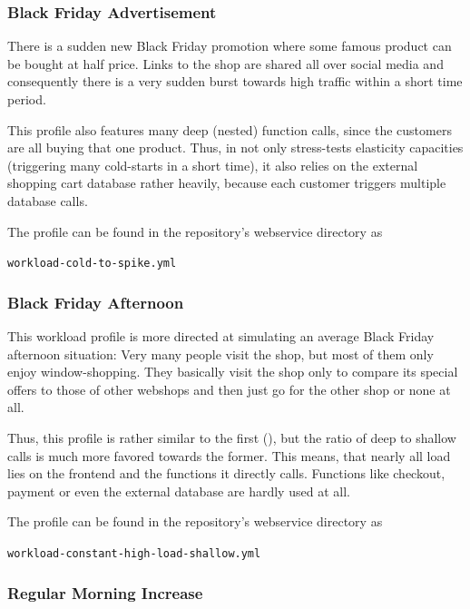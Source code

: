\documentclass[../main.tex]{subfiles}
\begin{document}
\subsubsection{Black Friday Advertisement}%
\label{ssub:webshopProfileBlackFridayAds}

There is a sudden new Black Friday promotion where some famous product can be bought at half price.
Links to the shop are shared all over social media and consequently there is a very sudden burst towards high traffic
within a short time period.

This profile also features many deep (nested) function calls, since the customers are all buying that one product.
Thus, in not only stress-tests elasticity capacities (triggering many cold-starts in a short time),
it also relies on the external shopping cart database rather heavily, because each customer triggers multiple database calls.

The profile can be found in the repository's webservice directory as 
\begin{tcolorbox}
\quad\texttt{workload-cold-to-spike.yml}
\end{tcolorbox}

\subsubsection{Black Friday Afternoon}%
\label{ssub:webshopProfileBlackFridayDaytime}

This workload profile is more directed at simulating an average Black Friday afternoon situation:
Very many people visit the shop, but most of them only enjoy window-shopping. 
They basically visit the shop only to compare its special offers to those of other webshops
and then just go for the other shop or none at all.

Thus, this profile is rather similar to the first (),
but the ratio of deep to shallow calls is much more favored towards the former.
This means, that nearly all load lies on the frontend and the functions it directly calls.
Functions like checkout, payment or even the external database are hardly used at all.

The profile can be found in the repository's webservice directory as 
\begin{tcolorbox}
\quad\texttt{workload-constant-high-load-shallow.yml}
\end{tcolorbox}

\subsubsection{Regular Morning Increase}%
\label{ssub:webshopProfileRegularMorning}
\end{document}
